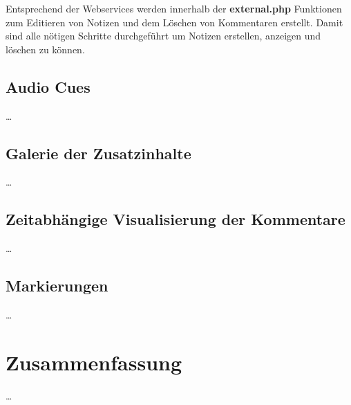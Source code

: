 Entsprechend der Webservices werden innerhalb der \textbf{external.php} Funktionen zum Editieren von Notizen und dem Löschen von Kommentaren erstellt. Damit sind alle nötigen Schritte durchgeführt um Notizen erstellen, anzeigen und löschen zu können.

\subsection{Audio Cues}
\dots

\subsection{Galerie der Zusatzinhalte}
\dots

\subsection{Zeitabhängige Visualisierung der Kommentare}
\dots

\subsection{Markierungen}
\dots

%


\section{Zusammenfassung}
\dots